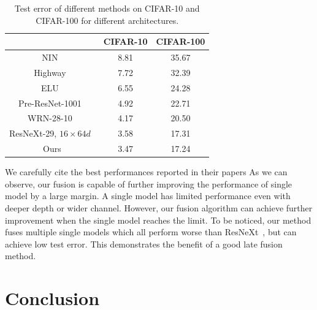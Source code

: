 \documentclass[10pt,twocolumn,letterpaper]{article}
\begin{document}
\begin{table}[ht]
\centering
\begin{tabular}{c|c|c}\hline
                                                    &  CIFAR-10 & CIFAR-100  \\\hline
NIN~\cite{lin2013network}                           &   8.81    &  35.67     \\\hline
Highway~\cite{srivastava2015highway}                &   7.72    &  32.39     \\\hline
ELU~\cite{clevert2015fast}                          &   6.55    &  24.28     \\\hline
Pre-ResNet-1001~\cite{he2016identity}               &   4.92    &  22.71     \\\hline
WRN-28-10~\cite{zagoruyko2016wide}                  &   4.17    &  20.50     \\\hline
ResNeXt-29, $16\times64d$~\cite{xie2016aggregated}  &   3.58    &  17.31     \\\hline
Ours                                                &   3.47    &  17.24     \\\hline
\end{tabular}
\caption{Test error of different methods on CIFAR-10 and CIFAR-100 for different architectures.
}
\label{table:state_of_the_art}
\end{table}

We carefully cite the best performances reported in their papers
\cite{clevert2015fast,he2016identity,lin2013network,srivastava2015highway,xie2016aggregated,zagoruyko2016wide}
As we can observe, our fusion is capable of further improving the performance of single model by a large margin.
A single model has limited performance even with deeper depth or wider channel.
However, our fusion algorithm can achieve further improvement when the single model reaches the limit.
To be noticed, our method fuses multiple single models which all perform worse than ResNeXt~\cite{xie2016aggregated},
but can achieve low test error.
This demonstrates the benefit of a good late fusion method.

\section{Conclusion}
\end{document}
